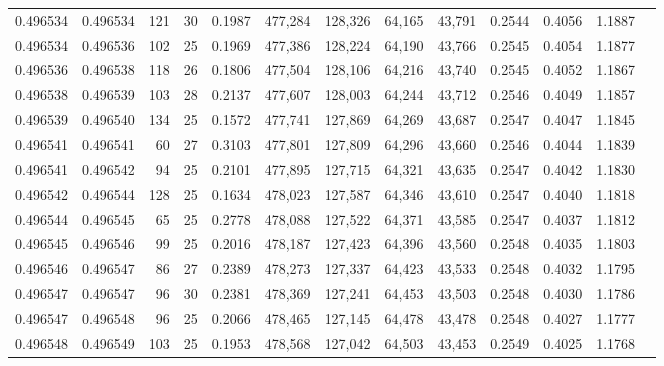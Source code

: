 \begin{tabular}{rrrrrrrrrrrrr}
0.496534 & 0.496534 & 121 &  30 &                                     0.1987 & 477,284 & 128,326 &  64,165 &  43,791 & 0.2544 & 0.4056 & 1.1887 \\
0.496534 & 0.496536 & 102 &  25 &                                     0.1969 & 477,386 & 128,224 &  64,190 &  43,766 & 0.2545 & 0.4054 & 1.1877 \\
0.496536 & 0.496538 & 118 &  26 &                                     0.1806 & 477,504 & 128,106 &  64,216 &  43,740 & 0.2545 & 0.4052 & 1.1867 \\
0.496538 & 0.496539 & 103 &  28 &                                     0.2137 & 477,607 & 128,003 &  64,244 &  43,712 & 0.2546 & 0.4049 & 1.1857 \\
0.496539 & 0.496540 & 134 &  25 &                                     0.1572 & 477,741 & 127,869 &  64,269 &  43,687 & 0.2547 & 0.4047 & 1.1845 \\
0.496541 & 0.496541 &  60 &  27 &                                     0.3103 & 477,801 & 127,809 &  64,296 &  43,660 & 0.2546 & 0.4044 & 1.1839 \\
0.496541 & 0.496542 &  94 &  25 &                                     0.2101 & 477,895 & 127,715 &  64,321 &  43,635 & 0.2547 & 0.4042 & 1.1830 \\
0.496542 & 0.496544 & 128 &  25 &                                     0.1634 & 478,023 & 127,587 &  64,346 &  43,610 & 0.2547 & 0.4040 & 1.1818 \\
0.496544 & 0.496545 &  65 &  25 &                                     0.2778 & 478,088 & 127,522 &  64,371 &  43,585 & 0.2547 & 0.4037 & 1.1812 \\
0.496545 & 0.496546 &  99 &  25 &                                     0.2016 & 478,187 & 127,423 &  64,396 &  43,560 & 0.2548 & 0.4035 & 1.1803 \\
0.496546 & 0.496547 &  86 &  27 &                                     0.2389 & 478,273 & 127,337 &  64,423 &  43,533 & 0.2548 & 0.4032 & 1.1795 \\
0.496547 & 0.496547 &  96 &  30 &                                     0.2381 & 478,369 & 127,241 &  64,453 &  43,503 & 0.2548 & 0.4030 & 1.1786 \\
0.496547 & 0.496548 &  96 &  25 &                                     0.2066 & 478,465 & 127,145 &  64,478 &  43,478 & 0.2548 & 0.4027 & 1.1777 \\
0.496548 & 0.496549 & 103 &  25 &                                     0.1953 & 478,568 & 127,042 &  64,503 &  43,453 & 0.2549 & 0.4025 & 1.1768 \\

\end{tabular}
